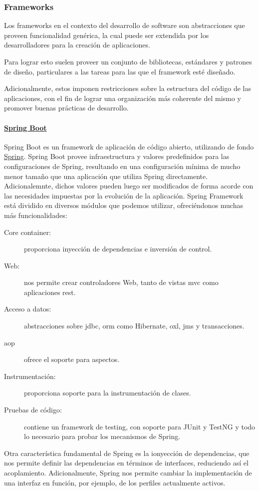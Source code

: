 \subsubsection{Frameworks}
Los frameworks en el contexto del desarrollo de software son abstracciones que proveen funcionalidad genérica, la cual puede ser extendida por los desarrolladores para la creación de aplicaciones.

Para lograr esto suelen proveer un conjunto de bibliotecas, estándares y patrones de diseño, particulares a las tareas para las que el framework esté diseñado.

Adicionalmente, estos imponen restricciones sobre la estructura del código de las aplicaciones, con el fin de lograr una organización más coherente del mismo y promover buenas prácticas de desarrollo.

\paragraph{\href{https://spring.io/projects/spring-boot}{Spring Boot}}\label{para:spring}
Spring Boot es un framework de aplicación de código abierto, utilizando de fondo \href{https://spring.io/}{Spring}. Spring Boot provee infraestructura y valores predefinidos para las configuraciones de Spring, resultando en una configuración mínima de mucho menor tamaño que una aplicación que utiliza Spring directamente. Adicionalemnte, dichos valores pueden luego ser modificados de forma acorde con las necesidades impuestas por la evolución de la aplicación.
Spring Framework está dividido en diversos módulos que podemos utilizar, ofreciéndonos muchas más funcionalidades:
\begin{description}
    \item[Core container:] proporciona inyección de dependencias e inversión de control.
    \item[Web:] nos permite crear controladores Web, tanto de vistas \acrfull{mvc} como aplicaciones \acrfull{rest}.
    \item[Acceso a datos:] abstracciones sobre \acrfull{jdbc}, \acrfull{orm} como Hibernate, \acrfull{oxl}, \acrfull{jms} y transacciones.
    \item[\acrfull{aop}] ofrece el soporte para aspectos.
    \item[Instrumentación:] proporciona soporte para la instrumentación de clases.
    \item[Pruebas de código:] contiene un framework de testing, con soporte para JUnit y TestNG y todo lo necesario para probar los mecanismos de Spring.
\end{description}
Otra característica fundamental de Spring es la ionyección de dependencias, que nos permite definir las dependencias en términos de interfaces, reduciendo así el acoplamiento. Adicionalmente, Spring nos permite cambiar la implementación de una interfaz en función, por ejemplo, de los perfiles actualmente activos.

